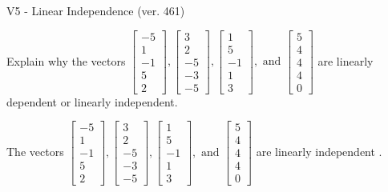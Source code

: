 \begin{exercise}
  \begin{exerciseTitle}V5 - Linear Independence (ver. 461)\end{exerciseTitle}
  \begin{exerciseStatement}
    Explain why the vectors \(\left[\begin{array}{r}
-5 \\
1 \\
-1 \\
5 \\
2
\end{array}\right] , \left[\begin{array}{r}
3 \\
2 \\
-5 \\
-3 \\
-5
\end{array}\right] , \left[\begin{array}{r}
1 \\
5 \\
-1 \\
1 \\
3
\end{array}\right] , \text{ and } \left[\begin{array}{r}
5 \\
4 \\
4 \\
4 \\
0
\end{array}\right]\) are linearly dependent or linearly independent.	


  \end{exerciseStatement}
  \begin{exerciseAnswer}
   The vectors \(\left[\begin{array}{r}
-5 \\
1 \\
-1 \\
5 \\
2
\end{array}\right] , \left[\begin{array}{r}
3 \\
2 \\
-5 \\
-3 \\
-5
\end{array}\right] , \left[\begin{array}{r}
1 \\
5 \\
-1 \\
1 \\
3
\end{array}\right] , \text{ and } \left[\begin{array}{r}
5 \\
4 \\
4 \\
4 \\
0
\end{array}\right]\) are 
  	 linearly independent  .
  


  \end{exerciseAnswer}
\end{exercise}